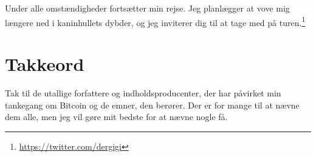 \documentclass[paper=6in:9in,pagesize=pdftex,headinclude=on,footinclude=on,12pt]{scrbook}
\begin{document}
Under alle omstændigheder fortsætter min rejse. Jeg planlægger at vove mig længere ned i kaninhullets dybder, og jeg inviterer dig til at tage med på turen.\footnote{\url{https://twitter.com/dergigi}}%
%

\cleardoublepage

\chapter*{Takkeord}

Tak til de utallige forfattere og indholdsproducenter, der har påvirket min tankegang om Bitcoin og de emner, den berører. Der er for mange til at nævne dem alle, men jeg vil gøre mit bedste for at nævne nogle få.\begin{itemize}

\end{itemize}
\end{document}

